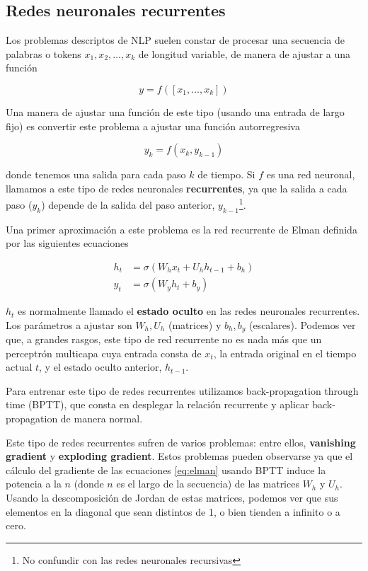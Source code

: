 \subsection{Redes neuronales recurrentes}

Los problemas descriptos de NLP suelen constar de procesar una secuencia de palabras o tokens $x_1, x_2, \ldots, x_k$ de longitud variable, de manera de ajustar a una función

\begin{equation*}
    y = f([x_1, \ldots, x_k])
\end{equation*}

Una manera de ajustar una función de este tipo (usando una entrada de largo fijo) es convertir este problema a ajustar una función autorregresiva

\begin{equation*}
    y_k = f(x_k, y_{k-1})
\end{equation*}

donde tenemos una salida para cada paso $k$ de tiempo. Si $f$ es una red neuronal, llamamos a este tipo de redes neuronales \textbf{recurrentes}, ya que la salida a cada paso ($y_k$) depende de la salida del paso anterior, $y_{k-1}$\footnote{No confundir con las redes neuronales recursivas}.

Una primer aproximación a este problema es la red recurrente de Elman \cite{elman1990finding} definida por las siguientes ecuaciones

\begin{align}
h_t &= \sigma(W_h x_t + U_h h_{t-1} + b_h) \\
y_t &= \sigma(W_y h_t + b_y)
\label{eq:elman}
\end{align}

$h_t$ es normalmente llamado el \textbf{estado oculto} en las redes neuronales recurrentes. Los parámetros a ajustar son $W_h, U_h$ (matrices) y $b_h, b_y$ (escalares). Podemos ver que, a grandes rasgos, este tipo de red recurrente no es nada más que un perceptrón multicapa cuya entrada consta de $x_t$, la entrada original en el tiempo actual $t$, y el estado oculto anterior, $h_{t-1}$.

Para entrenar este tipo de redes recurrentes utilizamos back-propagation through time (BPTT), que consta en desplegar la relación recurrente y aplicar back-propagation de manera normal. 

Este tipo de redes recurrentes sufren de varios problemas: entre ellos, \textbf{vanishing gradient} y \textbf{exploding gradient}. Estos problemas pueden observarse ya que el cálculo del gradiente de las ecuaciones \ref{eq:elman} usando BPTT induce la potencia a la $n$ (donde $n$ es el largo de la secuencia) de las matrices $W_h$ y $U_h$. Usando la descomposición de Jordan de estas matrices, podemos ver que sus elementos en la diagonal que sean distintos de 1, o bien tienden a infinito o a cero.

